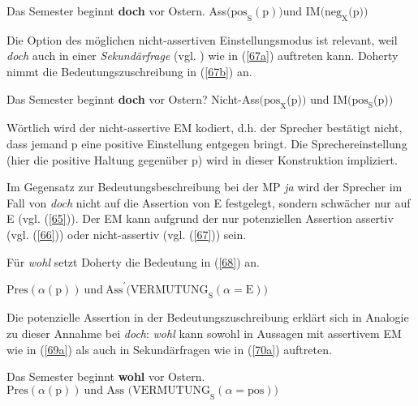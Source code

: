 \begin{exe}
	\ex\label{66} 
		\begin{xlist}	
			\ex\label{66a} Das Semester beginnt \textbf{doch} vor Ostern.
			\ex\label{66b} Ass$\textrm{(pos}_{\textrm{S}}(\textrm{p})) \textrm{und IM(neg}_{\textrm{X}}\textrm{(p))}$
		\end{xlist}
\end{exe}
Die Option des möglichen nicht-assertiven Einstellungsmodus ist relevant, weil \textit{doch} auch in einer \textit{Sekundärfrage}  (vgl. \citealt[68]{Doherty1985}) wie in (\ref{67a}) auftreten kann. Doherty nimmt die Bedeutungszuschreibung in (\ref{67b}) an.
\begin{exe}
	\ex\label{67} 
		\begin{xlist}	
			\ex\label{67a} Das Semester beginnt \textbf{doch} vor Ostern?
			\ex\label{67b} Nicht-Ass$\textrm{(pos}_{\textrm{X}}$(\textrm{p})$)$ \textrm{und IM}$(\textrm{pos}_{\textrm{S}}$(\textrm{p})$)$
		\end{xlist}
\end{exe}
Wörtlich wird der nicht-assertive EM kodiert, d.h. der Sprecher bestätigt nicht, dass jemand p eine positive Einstellung entgegen bringt. Die Sprecher\-einstellung (hier die positive Haltung gegenüber p) wird in dieser Konstruktion impliziert. 

Im Gegensatz zur Bedeutungsbeschreibung bei der MP \textit{ja} wird der Sprecher im Fall von \textit{doch} nicht auf die Assertion von E festgelegt, sondern schwächer nur auf E (vgl. (\ref{65})). Der EM kann aufgrund der nur potenziellen Assertion assertiv (vgl. (\ref{66})) oder nicht-assertiv (vgl. (\ref{67})) sein.

Für \textit{wohl} setzt Doherty die Bedeutung in (\ref{68}) an.

\begin{exe}
	\ex\label{68} 
	$\textrm{Pres}(\alpha (\textrm{p})) \ \textrm{und}\ \textrm{Ass}^{\prime} \textrm{(VERMUTUNG}_{\textrm{S}}(\alpha = \textrm{E}))$
	\hfill\hbox{\citet[82]{Doherty1985}}
\end{exe}
Die potenzielle Assertion in der Bedeutungszuschreibung erklärt sich in Analogie zu dieser Annahme bei \textit{doch}: \textit{wohl} kann sowohl in Aussagen mit assertivem EM wie in (\ref{69a}) als auch in Sekundärfragen wie in (\ref{70a}) auftreten.

\begin{exe}
	\ex\label{69} 
		\begin{xlist}	
			\ex\label{69a} Das Semester beginnt \textbf{wohl} vor Ostern.
			\ex\label{69b} $\textrm{Pres}(\alpha(\textrm{p})) \ \textrm{und Ass (VERMUTUNG}_{\textrm{S}}(\alpha = \textrm{pos}))$
		\end{xlist}
\end{exe}


